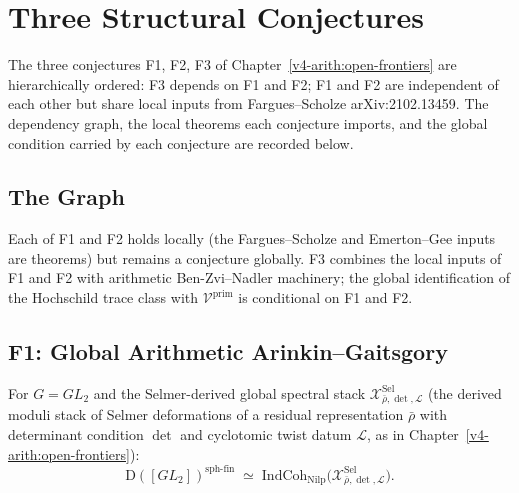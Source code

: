 \chapter{Three Structural Conjectures}
\label{v4-arith:app:three-conjectures-dep}

The three conjectures F1, F2, F3 of Chapter~\ref{v4-arith:open-frontiers}
are hierarchically ordered: F3 depends on F1 and F2; F1 and F2 are
independent of each other but share local inputs from Fargues--Scholze
arXiv:2102.13459. The dependency graph, the local theorems each
conjecture imports, and the global condition carried by each
conjecture are recorded below.

\section{The Graph}
\label{v4-arith:app:C:graph}

\begin{center}
\end{center}

Each of F1 and F2 holds locally (the Fargues--Scholze and Emerton--Gee
inputs are theorems) but remains a conjecture globally. F3 combines
the local inputs of F1 and F2 with arithmetic Ben-Zvi--Nadler
machinery; the global identification of the Hochschild trace class
with \(\mathcal{V}^{\mathrm{prim}}\) is conditional on F1 and F2.

\section{F1: Global Arithmetic Arinkin--Gaitsgory}
\label{v4-arith:app:C:F1-details}

\begin{conjecture}[restatement of F1]
\label{v4-arith:app:C:F1-restatement}
For \(G=GL_{2}\) and the Selmer-derived global spectral stack
\(\mathcal{X}^{\mathrm{Sel}}_{\bar\rho,\det,\mathcal{L}}\) (the
derived moduli stack of Selmer deformations of a residual
representation \(\bar\rho\) with determinant condition \(\det\) and
cyclotomic twist datum \(\mathcal{L}\), as in
Chapter~\ref{v4-arith:open-frontiers}):
\begin{equation}
\mathrm{D}([GL_{2}])^{\mathrm{sph\text{-}fin}}\;\simeq\;\mathrm{IndCoh}_{\mathrm{Nilp}}\bigl(\mathcal{X}^{\mathrm{Sel}}_{\bar\rho,\det,\mathcal{L}}\bigr).
\end{equation}
\end{conjecture}

